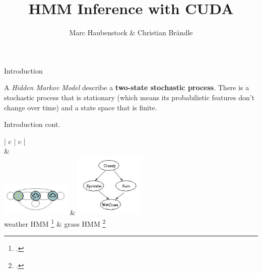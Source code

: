 \documentclass[11pt]{beamer}
\begin{document}
\begin{frame}
\title{HMM Inference with CUDA}
\subtitle{Marc Haubenstock \& Christian Brändle}

\titlepage
\end{frame}


\begin{frame}{Introduction}

A \emph{Hidden Markov Model} describe a \textbf{two-state stochastic process}.
There is a stochastic process that is stationary (which means its probabilistic features don't change over time) and a state space that is finite.

\end{frame}

\begin{frame}{Introduction cont.}
\begin{table}[h]
	\begin{center}
		\begin{tabular}{| c | c |}
			\hline
			 \\
			\hline
			& \\
			\includegraphics[width=0.25\textwidth]{./Images/FiniteStateAutomaton_1.png} & \includegraphics[width=0.25\textwidth]{./Images/FiniteStateAutomaton_2.png} \\
			\hline
			weather HMM \footcite{hmm_fb} & grass HMM \footcite{gm_bn} \\
			\hline
		\end{tabular}
	\end{center}
	\caption{Two finite state automatons that describe the state space of two different HMMs. Nodes correspond to states and edges to transition probabilites betwenn states that are bigger than $0$.}
	\label{tab:FiniteSA}
\end{table}


\end{frame}
\end{document}
